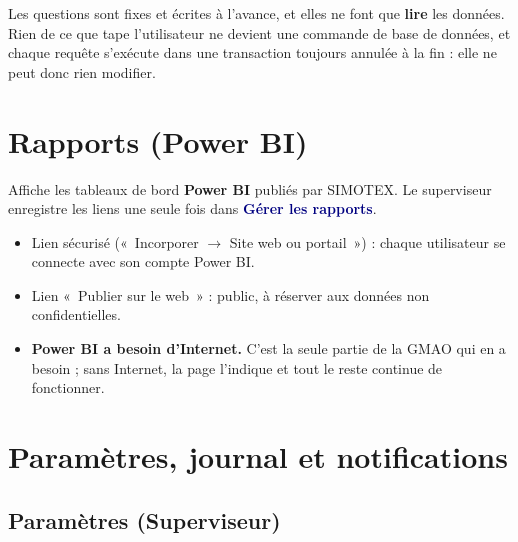 \documentclass[11pt,a4paper]{article}
\newcommand{\ui}[1]{\textbf{\textcolor{navy}{#1}}}          %
\begin{document}
\begin{retenir}
Les questions sont fixes et écrites à l'avance, et elles ne font que \textbf{lire} les données. Rien de ce que tape l'utilisateur ne devient une commande de base de données, et chaque requête s'exécute dans une transaction toujours annulée à la fin : elle ne peut donc rien modifier.
\end{retenir}

\section{Rapports (Power BI)}

Affiche les tableaux de bord \textbf{Power BI} publiés par SIMOTEX. Le superviseur enregistre les liens une seule fois dans \ui{Gérer les rapports}.

\begin{itemize}
  \item Lien sécurisé («~Incorporer $\rightarrow$ Site web ou portail~») : chaque utilisateur se connecte avec son compte Power BI.
  \item Lien «~Publier sur le web~» : public, à réserver aux données non confidentielles.
  \item \textbf{Power BI a besoin d'Internet.} C'est la seule partie de la GMAO qui en a besoin ; sans Internet, la page l'indique et tout le reste continue de fonctionner.
\end{itemize}

\section{Paramètres, journal et notifications}

\subsection{Paramètres (Superviseur)}
\end{document}
